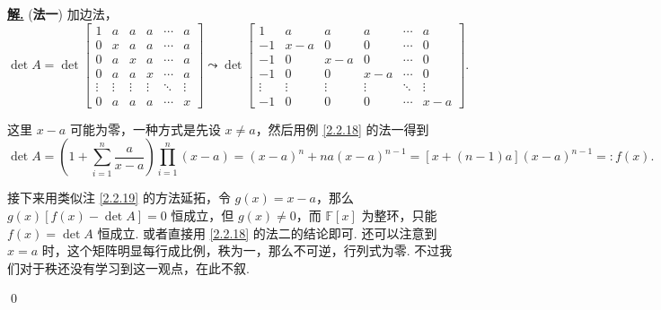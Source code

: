 \documentclass[10pt,openany]{article}
\theoremstyle{thmstyle} %
\theoremstyle{defstyle} %
\theoremstyle{prostyle} %
\theoremstyle{exastyle}
\theoremstyle{remstyle}
\newenvironment{solution}{\par\underline{\textbf{解.}} \;\fangsong}{\qed\par}
\newcommand{\F}{\mathbb{F}}
\begin{document}
\begin{solution}
	(\textbf{法一}) 加边法，
	\[ \det A= \det \begin{bmatrix}
		1 & a & a & a & \cdots & a \\
		0 & x & a & a & \cdots & a \\
		0 & a & x & a & \cdots & a \\
		0 & a & a & x & \cdots & a \\
		\vdots & \vdots & \vdots & \vdots & \ddots & \vdots \\
		0 & a & a & a & \cdots & x
	\end{bmatrix} \leadsto  \det \begin{bmatrix}
	1 & a & a & a & \cdots & a \\
	-1 & x-a & 0 & 0 & \cdots & 0 \\
	-1 & 0 & x-a & 0 & \cdots & 0 \\
	-1 & 0 & 0 & x-a & \cdots & 0 \\
	\vdots & \vdots & \vdots & \vdots & \ddots & \vdots \\
	-1 & 0 & 0 & 0 & \cdots & x-a
	\end{bmatrix}. \]
	
	这里 \( x-a \) 可能为零，一种方式是先设 \( x \neq a \)，然后用例 \ref{2.2.18} 的法一得到
	\[ \det A= \left( 1+ \sum_{i=1}^{n}\frac{a}{x-a} \right) \prod_{i=1}^{n} (x-a)= (x-a)^n+na(x-a)^{n-1}=[x+(n-1)a](x-a)^{n-1}=:f(x). \]
	
	接下来用类似注 \ref{2.2.19} 的方法延拓，令 \( g(x)=x-a\)，那么 \( g(x)[f(x)-\det A]=0 \) 恒成立，但 \( g(x) \neq 0 \)，而 \( \F[x] \) 为整环，只能 \( f(x)=\det A \) 恒成立. 或者直接用 \ref{2.2.18} 的法二的结论即可. 还可以注意到 \( x=a \) 时，这个矩阵明显每行成比例，秩为一，那么不可逆，行列式为零. 不过我们对于秩还没有学习到这一观点，在此不叙.
	
	\vspace{1ex}
	

\end{solution}
\end{document}
